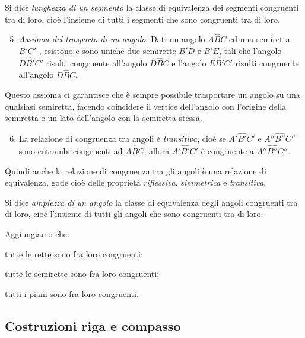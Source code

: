 \begin{definizione}
Si dice \emph{lunghezza di un segmento} la classe di equivalenza dei 
segmenti congruenti tra di loro, cioè l'insieme di tutti i segmenti 
che sono congruenti tra di loro.
\end{definizione}

\begin{enumerate}[label=\Roman{*}., nosep]
\setcounter{enumi}{4}
\item \emph{Assioma del trasporto di un angolo}. Dati un angolo 
\(A\widehat{B}C\) ed una semiretta \(B'C'\) , esistono e sono uniche due 
semirette \(B'D\) e \(B'E\), tali che l'angolo \(D\widehat{B'}C'\) risulti 
congruente all'angolo \(D\widehat{B}C\) e l'angolo \(E\widehat{B'}C'\) 
risulti congruente all'angolo \(D\widehat{B}C\).
\end{enumerate}
Questo assioma ci garantisce che è sempre possibile trasportare un 
angolo su una qualsiasi semiretta, facendo coincidere il vertice 
dell'angolo con l'origine della semiretta e un lato dell'angolo con 
la semiretta stessa.

\begin{enumerate}[label=\Roman{*}., nosep]
\setcounter{enumi}{5}
\item La relazione di congruenza tra angoli è \emph{transitiva}, cioè 
se \(A'\widehat{B'}C'\) e \(A''\widehat{B''}C''\) sono entrambi 
congruenti ad \(A\widehat{B}C\), allora \(A'\widehat{B'}C'\) è congruente 
a \(A''\widehat{B''}C''\).
\end{enumerate}

Quindi anche la relazione di congruenza tra gli angoli è una 
relazione di equivalenza, gode cioè delle proprietà 
\emph{riflessiva}, \emph{simmetrica} e \emph{transitiva}.

\begin{definizione}
Si dice \emph{ampiezza di un angolo} la classe di equivalenza degli 
angoli congruenti tra di loro, cioè l'insieme di tutti gli angoli che 
sono congruenti tra di loro.
\end{definizione}

Aggiungiamo che:
\begin{itemize*}
\item tutte le rette sono fra loro congruenti;
\item tutte le semirette sono fra loro congruenti;
\item tutti i piani sono fra loro congruenti.
\end{itemize*}

\subsection{Costruzioni riga e compasso}

